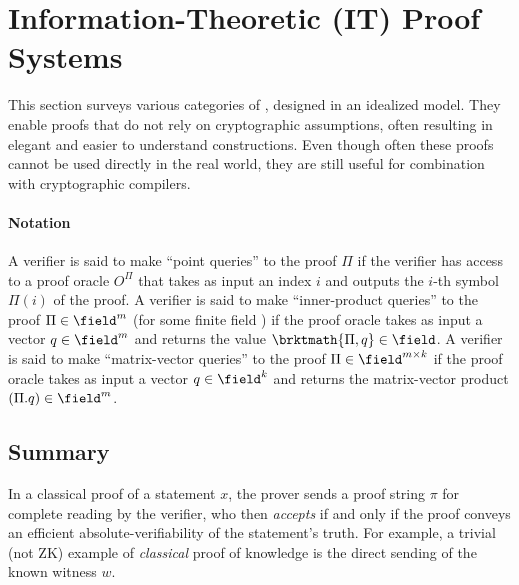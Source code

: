 \section{Information-Theoretic (IT) Proof Systems}
\label{paradigms:IT}
This section surveys various categories of 
\protect{}, designed in an idealized model.
They enable proofs that do not rely on cryptographic assumptions, often resulting in elegant and easier to understand constructions. 
Even though often these proofs cannot be used directly in the real world, they are still useful for combination with cryptographic compilers.
\loosen


%



\paragraph{Notation} 
A verifier is said to make ``point queries'' to the proof $\Pi$ if the verifier has access to a proof oracle $O^{\Pi}$ that takes as input an index $i$ and outputs the $i$-th symbol $\Pi(i)$ of the proof. 
A verifier is said to make ``inner-product queries'' to the proof $\Pi \in \field^m$ (for some finite field \field) if the proof oracle takes as input a vector $q \in \field^m$ and returns the value $\brktmath{\Pi, q} \in \field$. 
A verifier is said to make ``matrix-vector queries'' to the proof $\Pi \in \field^{m\times k}$ if the proof oracle takes as input a vector $q \in \field^k$ and returns the matrix-vector product $(\Pi.q) \in \field^m$.


\subsection{Summary}
\label{paradigms:taxonomy:proof-systems}


In a classical proof of a statement $x$, the prover sends a proof string $\pi$ for complete reading by the verifier, who then \emph{accepts} if and only if the proof conveys an efficient absolute-verifiability of the statement's truth.
For example, a trivial (not ZK) example of \emph{classical} proof of knowledge is the direct sending of the known witness $w$.

